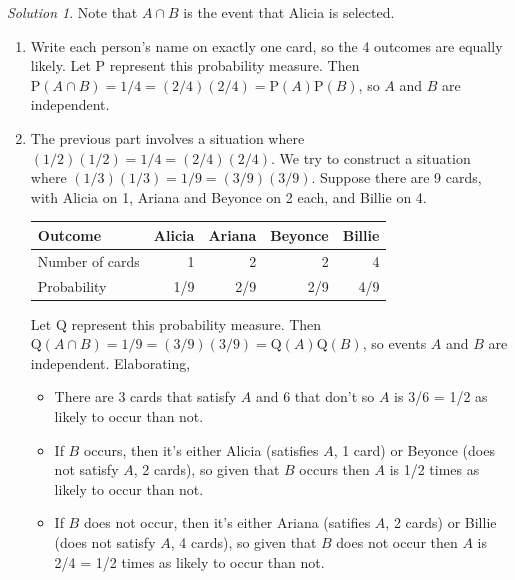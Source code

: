 \documentclass[
  letterpaper,
  DIV=11,
  numbers=noendperiod]{scrreprt}
\providecommand{\tightlist}{%
  \setlength{\itemsep}{0pt}\setlength{\parskip}{0pt}}
\theoremstyle{plain}
\theoremstyle{definition}
\theoremstyle{definition}
\theoremstyle{definition}
\theoremstyle{remark}
\newtheorem{refsolution}{Solution}[chapter]
\begin{document}
\begin{tcolorbox}[enhanced jigsaw, opacityback=0, rightrule=.15mm, coltitle=black, colframe=quarto-callout-tip-color-frame, toprule=.15mm, colbacktitle=quarto-callout-tip-color!10!white, opacitybacktitle=0.6, left=2mm, toptitle=1mm, breakable, title={Solution (click to expand)}, bottomtitle=1mm, colback=white, leftrule=.75mm, titlerule=0mm, arc=.35mm, bottomrule=.15mm]

\begin{refsolution}
Note that \(A \cap B\) is the event that Alicia is selected.

\begin{enumerate}
\def\labelenumi{\arabic{enumi}.}
\item
  Write each person's name on exactly one card, so the 4 outcomes are
  equally likely. Let \(\textrm{P}\) represent this probability measure.
  Then
  \(\textrm{P}(A \cap B) = 1/4 = (2/4)(2/4)=\textrm{P}(A)\textrm{P}(B)\),
  so \(A\) and \(B\) are independent.\\
\item
  The previous part involves a situation where
  \((1/2)(1/2)=1/4=(2/4)(2/4)\). We try to construct a situation where
  \((1/3)(1/3)=1/9=(3/9)(3/9)\). Suppose there are 9 cards, with Alicia
  on 1, Ariana and Beyonce on 2 each, and Billie on 4.

  \begin{longtable}[]{@{}lrrrr@{}}
  \toprule\noalign{}
  Outcome & Alicia & Ariana & Beyonce & Billie \\
  \midrule\noalign{}
  \endhead
  \bottomrule\noalign{}
  \endlastfoot
  Number of cards & 1 & 2 & 2 & 4 \\
  Probability & 1/9 & 2/9 & 2/9 & 4/9 \\
  \end{longtable}

  Let \(\textrm{Q}\) represent this probability measure. Then
  \(\textrm{Q}(A \cap B) = 1/9 = (3/9)(3/9)=\textrm{Q}(A)\textrm{Q}(B)\),
  so events \(A\) and \(B\) are independent. Elaborating,

  \begin{itemize}
  \tightlist
  \item
    There are 3 cards that satisfy \(A\) and 6 that don't so \(A\) is
    3/6 = 1/2 as likely to occur than not.
  \item
    If \(B\) occurs, then it's either Alicia (satisfies \(A\), 1 card)
    or Beyonce (does not satisfy \(A\), 2 cards), so given that \(B\)
    occurs then \(A\) is 1/2 times as likely to occur than not.
  \item
    If \(B\) does not occur, then it's either Ariana (satifies \(A\), 2
    cards) or Billie (does not satisfy \(A\), 4 cards), so given that
    \(B\) does not occur then \(A\) is 2/4 = 1/2 times as likely to
    occur than not.
  \end{itemize}


\end{enumerate}
\end{refsolution}
\end{tcolorbox}
\end{document}
